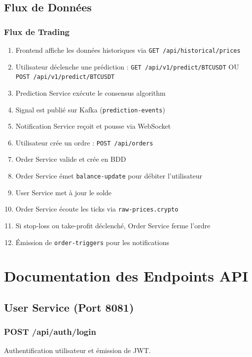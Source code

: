 \documentclass[12pt,a4paper,twoside]{report}
\begin{document}
\section{Flux de Données}

\subsection{Flux de Trading}
\begin{enumerate}
    \item Frontend affiche les données historiques via \texttt{GET /api/historical/prices}
    \item Utilisateur déclenche une prédiction : \texttt{GET /api/v1/predict/BTCUSDT} OU \texttt{POST /api/v1/predict/BTCUSDT}
    \item Prediction Service exécute le consensus algorithm
    \item Signal est publié sur Kafka (\texttt{prediction-events})
    \item Notification Service reçoit et pousse via WebSocket
    \item Utilisateur crée un ordre : \texttt{POST /api/orders}
    \item Order Service valide et crée en BDD
    \item Order Service émet \texttt{balance-update} pour débiter l'utilisateur
    \item User Service met à jour le solde
    \item Order Service écoute les ticks via \texttt{raw-prices.crypto}
    \item Si stop-loss ou take-profit déclenché, Order Service ferme l'ordre
    \item Émission de \texttt{order-triggers} pour les notifications
\end{enumerate}

\chapter{Documentation des Endpoints API}

\section{User Service (Port 8081)}

\subsection{POST /api/auth/login}
Authentification utilisateur et émission de JWT.
\end{document}
